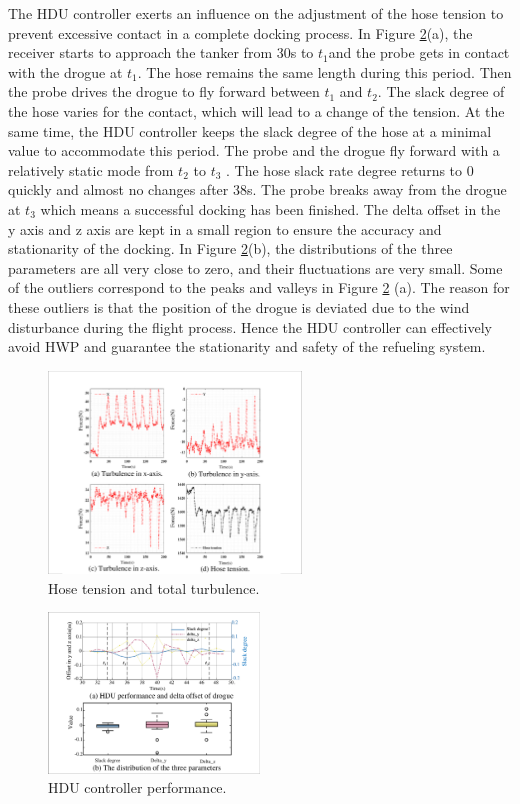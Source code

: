 The HDU controller exerts an influence on the adjustment of the hose tension to prevent excessive contact in a complete docking process. In Figure \ref{FIG_22}(a), the receiver starts to approach the tanker from 30s to $ t_1 $and the probe gets in contact with the drogue at $ t_1 $. The hose remains the same length during this period. Then the probe drives the drogue to fly forward between  $ t_1 $ and $  t_2 $. The slack degree of the hose varies for the contact, which will lead to a change of the tension. At the same time, the HDU controller keeps the slack degree of the hose at a minimal value to accommodate this period. The probe and the drogue fly forward with a relatively static mode from $  t_2 $ to $  t_3 $ . The hose slack rate degree returns to 0 quickly and almost no changes after 38s. The probe breaks away from the drogue at $  t_3 $ which means a successful docking has been finished. The delta offset in the y axis and z axis are kept in a small region to ensure the accuracy and stationarity of the docking. In Figure \ref{FIG_22}(b), the distributions of the three parameters are all very close to zero, and their fluctuations are very small. Some of the outliers correspond to the peaks and valleys in Figure \ref{FIG_22} (a). The reason for these outliers is that the position of the drogue is deviated due to the wind disturbance during the flight process. Hence the HDU controller can effectively avoid HWP and guarantee the stationarity and safety of the refueling system.

\begin{figure}[htpb]
	\centering
	\includegraphics[width=0.6\textwidth]{Figures/Figs_Ch5/Fig21.pdf}
	\caption{ Hose tension and total turbulence.}\label{FIG_21}
\end{figure}

\begin{figure}[h]
	\centering
	\includegraphics[width=0.5\textwidth]{Figures/Figs_Ch5/Fig22.pdf}
	\caption{HDU controller performance.}\label{FIG_22}
\end{figure}


